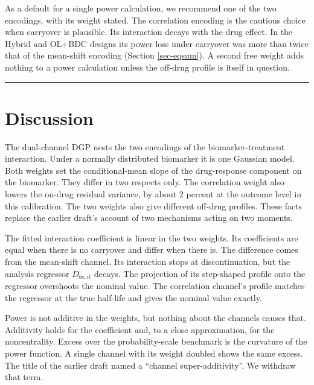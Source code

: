 \documentclass[
  11pt,
]{article}
\begin{document}
As a default for a single power calculation, we recommend one of the
two encodings, with its weight stated. The correlation encoding is the
cautious choice when carryover is plausible. Its interaction decays
with the drug effect. In the Hybrid and OL+BDC designs its power loss
under carryover was more than twice that of the mean-shift encoding
(Section \ref{sec-eqsum}). A second free weight adds nothing to a power
calculation unless the off-drug profile is itself in question.

\bigskip\noindent

\rule{\textwidth}{0.4pt}\bigskip

\section{Discussion}\label{discussion}

The dual-channel DGP nests the two encodings of the biomarker-treatment
interaction. Under a normally distributed biomarker it is one Gaussian
model. Both weights set the conditional-mean slope of the
drug-response component on the biomarker. They differ in two respects
only. The correlation weight also lowers the on-drug residual
variance, by about 2 percent at the outcome level in this calibration.
The two weights also give different off-drug profiles. These facts
replace the earlier draft's account of two mechanisms acting on two
moments.

The fitted interaction coefficient is linear in the two weights. Its
coefficients are equal when there is no carryover and differ when
there is. The difference comes from the mean-shift channel. Its
interaction stops at discontinuation, but the analysis regressor
\(D_{bc,it}\) decays. The projection of its step-shaped profile onto the
regressor overshoots the nominal value. The correlation channel's
profile matches the regressor at the true half-life and gives the
nominal value exactly.

Power is not additive in the weights, but nothing about the channels
causes that. Additivity holds for the coefficient and, to a close
approximation, for the noncentrality. Excess over the
probability-scale benchmark is the curvature of the power function.
A single channel with its weight doubled shows the same excess. The
title of the earlier draft named a ``channel super-additivity''. We
withdraw that term.
\end{document}
